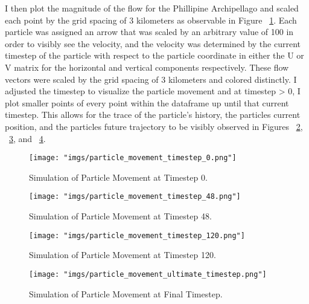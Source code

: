 \documentclass[11pt]{article}
\begin{document}
I then plot the magnitude of the flow for the Phillipine Archipellago and scaled each point by the grid spacing of 3 kilometers as observable in Figure ~\ref{fig:particle-movement-timestep-0}. Each particle was assigned an arrow that was scaled by an arbitrary value of 100 in order to visibly see the velocity, and the velocity was determined by the current timestep of the particle with respect to the particle coordinate in either the U or V matrix for the horizontal and vertical components respectively. These flow vectors were scaled by the grid spacing of 3 kilometers and colored distinctly. I adjusted the timestep to visualize the particle movement and at timestep > 0, I plot smaller points of every point within the dataframe up until that current timestep. This allows for the trace of the particle's history, the particles current position, and the particles future trajectory to be visibly observed in Figures ~\ref{fig:particle-movement-timestep-48}, ~\ref{fig:particle-movement-timestep-120}, and ~\ref{fig:particle-movement-ultimate-timestep}.


\begin{figure}[htbp]
    \centering
    \texttt{[image: "imgs/particle\_movement\_timestep\_0.png"]} %
    \caption{Simulation of Particle Movement at Timestep 0.}
    \label{fig:particle-movement-timestep-0}
\end{figure}
\FloatBarrier


\begin{figure}[htbp]
    \centering
    \texttt{[image: "imgs/particle\_movement\_timestep\_48.png"]} %
    \caption{Simulation of Particle Movement at Timestep 48.}
    \label{fig:particle-movement-timestep-48}
\end{figure}
\FloatBarrier


\begin{figure}[htbp]
    \centering
    \texttt{[image: "imgs/particle\_movement\_timestep\_120.png"]} %
    \caption{Simulation of Particle Movement at Timestep 120.}
    \label{fig:particle-movement-timestep-120}
\end{figure}
\FloatBarrier


\begin{figure}[htbp]
    \centering
    \texttt{[image: "imgs/particle\_movement\_ultimate\_timestep.png"]} %
    \caption{Simulation of Particle Movement at Final Timestep.}
    \label{fig:particle-movement-ultimate-timestep}
\end{figure}
\FloatBarrier
\end{document}
